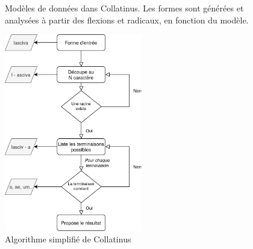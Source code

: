 \begin{figure}[h]
    \centering
    \caption{Modèles de données dans Collatinus. Les formes sont générées et analysées à partir des flexions et radicaux, en fonction du modèle. }
    \label{lemmatisation:outils:collatinusDB}
\end{figure}


\begin{figure}[h]
    \centering
    \includegraphics[width=6cm]{figures/chap3/outils/collatinus.png}
    \caption{Algorithme simplifié de Collatinus}
    \label{lemmatisation:outils:collatinusAlgorythme}
\end{figure}

